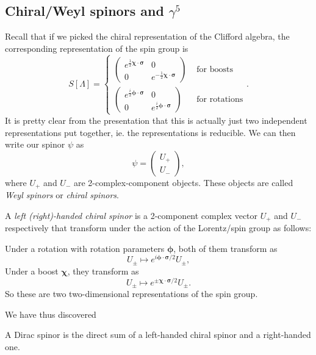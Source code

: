 \documentclass[a4paper]{article}
\begin{document}
\subsection{Chiral/Weyl spinors and \texorpdfstring{$\gamma^5$}{gamma^5}}
Recall that if we picked the chiral representation of the Clifford algebra, the corresponding representation of the spin group is
\[
  S[\Lambda] =
  \begin{cases}
    \begin{pmatrix}
      e^{\frac{1}{2}\boldsymbol\chi\cdot \boldsymbol\sigma} & 0\\
      0 & e^{-\frac{1}{2} \boldsymbol\chi \cdot \boldsymbol\sigma}
    \end{pmatrix}& \text{ for boosts}\\
    \begin{pmatrix}
      e^{\frac{i}{2}\boldsymbol\phi\cdot \boldsymbol\sigma} & 0\\
      0 & e^{\frac{i}{2} \boldsymbol\phi \cdot \boldsymbol\sigma}
    \end{pmatrix}& \text{ for rotations}
  \end{cases}.
\]
It is pretty clear from the presentation that this is actually just two independent representations put together, ie. the representations is reducible. We can then write our spinor $\psi$ as
\[
  \psi=
  \begin{pmatrix}
    U_+\\ U_-
  \end{pmatrix},
\]
where $U_+$ and $U_-$ are 2-complex-component objects. These objects are called \emph{Weyl spinors} or \emph{chiral spinors}.
\begin{defi}
  A \emph{left (right)-handed chiral spinor} is a 2-component complex vector $U_+$ and $U_-$ respectively that transform under the action of the Lorentz/spin group as follows:

  Under a rotation with rotation parameters $\boldsymbol\phi$, both of them transform as
  \[
    U_\pm \mapsto e^{i \boldsymbol\phi \cdot \boldsymbol\sigma/2} U_\pm,
  \]
  Under a boost $\boldsymbol\chi$, they transform as
  \[
    U_{\pm} \mapsto e^{\pm \boldsymbol\chi\cdot \boldsymbol\sigma/2} U_{\pm}.
  \]
  So these are two two-dimensional representations of the spin group.
\end{defi}
We have thus discovered
\begin{prop}
  A Dirac spinor is the direct sum of a left-handed chiral spinor and a right-handed one.
\end{prop}
\end{document}
